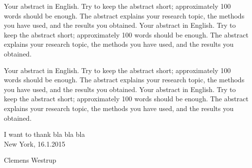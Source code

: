 \begin{abstractpage}[english]
  Your abstract in English. Try to keep the abstract short; approximately
  100 words should be enough. The abstract explains your research topic,
  the methods you have used, and the results you obtained.
  Your abstract in English. Try to keep the abstract short; approximately
  100 words should be enough. The abstract explains your research topic,
  the methods you have used, and the results you obtained.

  Your abstract in English. Try to keep the abstract short; approximately
  100 words should be enough. The abstract explains your research topic,
  the methods you have used, and the results you obtained.
  Your abstract in English. Try to keep the abstract short; approximately
  100 words should be enough. The abstract explains your research topic,
  the methods you have used, and the results you obtained.
\end{abstractpage}

\newpage


I want to thank bla bla bla
\\

\vspace{5cm}
New York, 16.1.2015

\vspace{5mm}
{\hfill Clemens Westrup \hspace{1cm}}

\newpage


\thesistableofcontents



%


